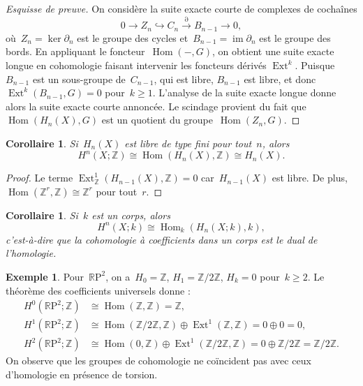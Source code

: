 \documentclass[12pt,a4paper,openany]{book}
\theoremstyle{definition}
\newtheorem{exemple}[definition]{Exemple}
\theoremstyle{plain}
\newtheorem{corollaire}[definition]{Corollaire}
\theoremstyle{remark}
\newcommand{\Z}{\mathbb{Z}}
\newcommand{\RP}{\mathbb{R}\mathrm{P}}
\DeclareMathOperator{\Hom}{Hom}
\DeclareMathOperator{\im}{im}
\begin{document}
\begin{proof}[Esquisse de preuve]
On considère la suite exacte courte de complexes de cochaînes
\[
  0 \to Z_n \hookrightarrow C_n \xrightarrow{\partial} B_{n-1} \to 0,
\]
où~$Z_n = \ker \partial_n$ est le groupe des cycles et~$B_{n-1} = \im \partial_n$
est le groupe des bords. En appliquant le foncteur~$\Hom(-, G)$, on obtient une
suite exacte longue en cohomologie faisant intervenir les foncteurs dérivés
$\operatorname{Ext}^k$. Puisque~$B_{n-1}$ est un sous-groupe de~$C_{n-1}$, qui est
libre, $B_{n-1}$ est libre, et donc~$\operatorname{Ext}^k(B_{n-1}, G) = 0$
pour~$k \geqslant 1$. L'analyse de la suite exacte longue donne alors la suite
exacte courte annoncée. Le scindage provient du fait que~$\Hom(H_n(X), G)$
est un quotient du groupe~$\Hom(Z_n, G)$.
\end{proof}

\begin{corollaire}\label{cor:coeff-univ-Z}
Si~$H_n(X)$ est libre de type fini pour tout~$n$, alors
\[
  H^n(X; \Z) \cong \Hom(H_n(X), \Z) \cong H_n(X).
\]
\end{corollaire}

\begin{proof}
Le terme $\operatorname{Ext}^1_\Z(H_{n-1}(X), \Z) = 0$ car~$H_{n-1}(X)$ est libre.
De plus, $\Hom(\Z^r, \Z) \cong \Z^r$ pour tout~$r$.
\end{proof}

\begin{corollaire}\label{cor:coeff-univ-corps}
Si~$k$ est un corps, alors
\[
  H^n(X; k) \cong \Hom_k(H_n(X; k), k),
\]
c'est-à-dire que la cohomologie à coefficients dans un corps est le dual de l'homologie.
\end{corollaire}

\begin{exemple}\label{ex:cohomologie-rp2}
\index{$\RP^2$!cohomologie}
Pour~$\RP^2$, on a~$H_0 = \Z$, $H_1 = \Z/2\Z$, $H_k = 0$ pour~$k \geqslant 2$.
Le théorème des coefficients universels donne :
\begin{align*}
  H^0(\RP^2; \Z) &\cong \Hom(\Z, \Z) = \Z,\\
  H^1(\RP^2; \Z) &\cong \Hom(\Z/2\Z, \Z) \oplus \operatorname{Ext}^1(\Z, \Z)
    = 0 \oplus 0 = 0,\\
  H^2(\RP^2; \Z) &\cong \Hom(0, \Z) \oplus \operatorname{Ext}^1(\Z/2\Z, \Z)
    = 0 \oplus \Z/2\Z = \Z/2\Z.
\end{align*}
On observe que les groupes de cohomologie ne coïncident pas avec ceux d'homologie
en présence de torsion.
\end{exemple}
\end{document}

